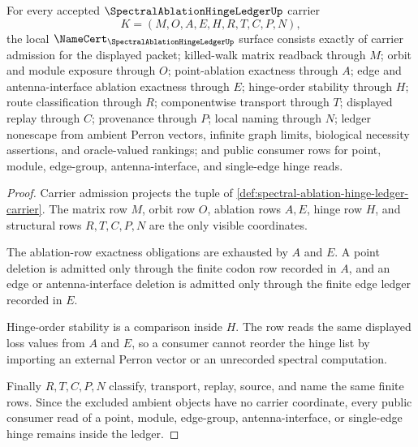\begin{theorem}
\label{thm:spectral-ablation-hinge-ledger-namecert-obligations}
For every accepted $\SpectralAblationHingeLedgerUp$ carrier
$$
K=(M,O,A,E,H,R,T,C,P,N),
$$
the local $\NameCert_{\SpectralAblationHingeLedgerUp}$ surface consists exactly of carrier admission for the displayed packet; killed-walk matrix readback through $M$; orbit and module exposure through $O$; point-ablation exactness through $A$; edge and antenna-interface ablation exactness through $E$; hinge-order stability through $H$; route classification through $R$; componentwise transport through $T$; displayed replay through $C$; provenance through $P$; local naming through $N$; ledger nonescape from ambient Perron vectors, infinite graph limits, biological necessity assertions, and oracle-valued rankings; and public consumer rows for point, module, edge-group, antenna-interface, and single-edge hinge reads.
\end{theorem}
\begin{proof}
Carrier admission projects the tuple of \autoref{def:spectral-ablation-hinge-ledger-carrier}. The matrix row $M$, orbit row $O$, ablation rows $A,E$, hinge row $H$, and structural rows $R,T,C,P,N$ are the only visible coordinates.

The ablation-row exactness obligations are exhausted by $A$ and $E$. A point deletion is admitted only through the finite codon row recorded in $A$, and an edge or antenna-interface deletion is admitted only through the finite edge ledger recorded in $E$.

Hinge-order stability is a comparison inside $H$. The row reads the same displayed loss values from $A$ and $E$, so a consumer cannot reorder the hinge list by importing an external Perron vector or an unrecorded spectral computation.

Finally $R,T,C,P,N$ classify, transport, replay, source, and name the same finite rows. Since the excluded ambient objects have no carrier coordinate, every public consumer read of a point, module, edge-group, antenna-interface, or single-edge hinge remains inside the ledger.
\end{proof}


